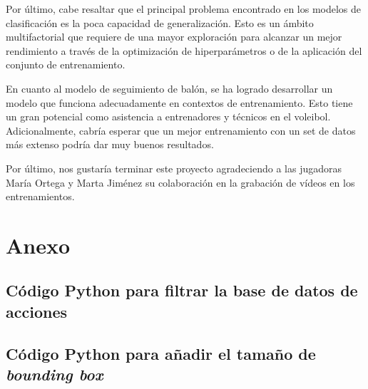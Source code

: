 \documentclass[12pt]{report} %
\begin{document}
    Por último, cabe resaltar que el principal problema encontrado en los modelos de clasificación es la poca capacidad de generalización. Esto es un ámbito multifactorial que requiere de una mayor exploración para alcanzar un mejor rendimiento a través de la optimización de hiperparámetros o de la aplicación del conjunto de entrenamiento.

    En cuanto al modelo de seguimiento de balón, se ha logrado desarrollar un modelo que funciona adecuadamente en contextos de entrenamiento. Esto tiene un gran potencial como asistencia a entrenadores y técnicos en el voleibol. Adicionalmente, cabría esperar que un mejor entrenamiento con un set de datos más extenso podría dar muy buenos resultados.

    Por último, nos gustaría terminar este proyecto agradeciendo a las jugadoras María Ortega y Marta Jiménez su colaboración en la grabación de vídeos en los entrenamientos.



    \clearpage

    \label{chap:bibliography}
    \printbibliography


    \chapter*{Anexo}
    \label{anexo}

    \section*{Código Python para filtrar la base de datos de acciones}
    \label{filtrado_script}
    

    \section*{Código Python para añadir el tamaño de \textit{bounding box}}
    \label{mod_ball}
    
\end{document}
